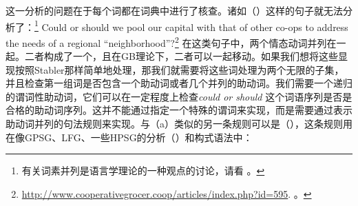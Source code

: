 这一分析的问题在于每个词都在词典中进行了核查。诸如（）这样的句子就无法分析了：\footnote{
  有关词素并列是语言学理论的一种观点的讨论，请看 。
} 
\ea
Could or should we pool our capital with that of other co-ops to address the needs of a regional
``neighborhood''?\footnote{
  \url{http://www.cooperativegrocer.coop/articles/index.php?id=595}. 。
}
\z
在这类句子中，两个情态动词并列在一起。二者构成了一个\xzero ，且在GB理论下，二者可以一起移动。如果我们想将这些显现按照Stabler那样简单地处理，那我们就需要将这些词处理为两个无限的子集，并且检查第一组词是否包含一个助动词或者几个并列的助动词。我们需要一个递归的谓词性助动词，它们可以在一定程度上检查\emph{could or should} 这个词语序列是否是合格的助动词序列。这并不能通过指定一个特殊的谓词来实现，而是需要通过表示助动词并列的句法规则来实现。与（a）类似的另一条规则可以是（），这条规则用在像GPSG\citep[]{GKPS85a}、LFG\citep[]{Falk84a-u}、一些HPSG的分析（\citealp[]{GSag2000a-u}）和构式语法中\citep{Fillmore99a}：
